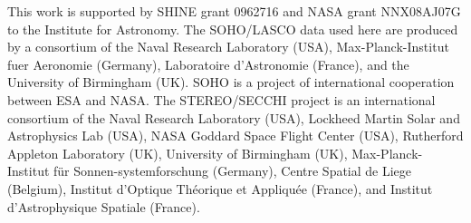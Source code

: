 \documentclass[structabstract]{aa}
\begin{document}
\begin{acknowledgements}
This work is supported by SHINE grant 0962716 and NASA grant NNX08AJ07G to the Institute for Astronomy. The SOHO/LASCO data used here are produced by a consortium of the Naval Research Laboratory (USA), Max-Planck-Institut fuer Aeronomie (Germany), Laboratoire d'Astronomie (France), and the University of Birmingham (UK). SOHO is a project of international cooperation between ESA and NASA. The STEREO/SECCHI project is an international consortium of the Naval Research Laboratory (USA), Lockheed Martin Solar and Astrophysics Lab (USA), NASA Goddard Space Flight Center (USA), Rutherford Appleton Laboratory (UK), University of Birmingham (UK), Max-Planck-Institut f\"{u}r Sonnen-systemforschung (Germany), Centre Spatial de Liege (Belgium), Institut d'Optique Th\'{e}orique et Appliqu\'{e}e (France), and Institut d'Astrophysique Spatiale (France). 
\end{acknowledgements}




  
\end{document}
